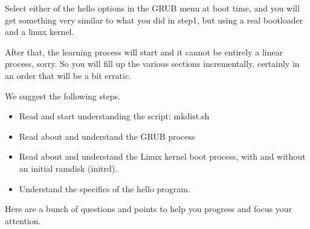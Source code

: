 \documentclass[10]{article}
\begin{document}
Select either of the hello options in the GRUB menu at boot time,
and you will get something very similar to what you did in step1,
but using a real bootloader and a linux kernel.

After that, the learning process will start and it cannot be entirely 
a linear process, sorry. So you will fill up the various sections
incrementally, certainly in an order that will be a bit erratic.

We suggest the following steps.

\begin{itemize}
\item Read and start understanding the script: mkdist.sh 
\item Read about and understand the GRUB process
\item Read about and understand the Linux kernel boot process,
with and without an initial ramdisk (initrd).
\item Understand the specifics of the hello program.
\end{itemize}

Here are a bunch of questions and points to help you progress
and focus your attention.
\end{document}
